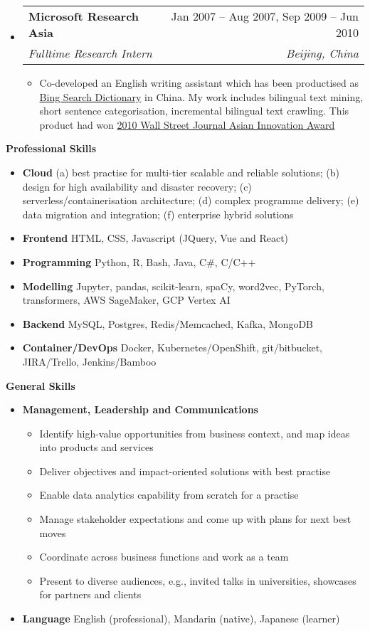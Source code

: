 \documentclass[letterpaper,12pt]{article}[leftmargin=*]
\makeatletter
\def \entryspacing {-0pt}
\renewcommand{\section}[2]{\vspace{5pt}
  \colorbox{secondary}{\color{white}\raggedbottom\normalsize\textbf{{#1}{\hspace{7pt}#2}}}
}
\newcommand{\resumeEntryStart}{\begin{itemize}[leftmargin=2.5mm]}
\newcommand{\resumeEntryEnd}{\end{itemize}\vspace{\entryspacing}}
\newcommand{\resumeItemListStart}{\begin{itemize}[leftmargin=4.5mm]}
\newcommand{\resumeItemListEnd}{\end{itemize}}
\newcommand{\resumeItem}[1]{
  \item\small{
    {#1 \vspace{-2pt}}
  }
}
\newcommand{\resumeEntryTSDL}[4]{
  \vspace{-1pt}\item[]
    \begin{tabularx}{0.97\textwidth}{X@{\hspace{60pt}}r}
      \textbf{\color{primary}#1} & {\firabook\color{accent}\small#2} \\
      \textit{\color{accent}\small#3} & \textit{\color{accent}\small#4} \\
    \end{tabularx}\vspace{-6pt}
}
\newcommand{\resumeEntryS}[2]{
  \item[]\small{
    \textbf{\color{primary}#1 }{ #2 \vspace{-6pt}}
  }
}
\makeatother
\begin{document}
  \resumeEntryStart
    \resumeEntryTSDL
      {Microsoft Research Asia}{Jan 2007 -- Aug 2007, Sep 2009 -- Jun 2010}
      {Fulltime Research Intern}{Beijing, China}
    \resumeItemListStart
      \resumeItem {Co-developed an English writing assistant which has been productised as \href{https://www.bing.com/dict?FORM=Z9LH3}{Bing Search Dictionary} in China. My work includes bilingual text mining, short sentence categorisation, incremental bilingual text crawling. This product had won \href{https://www.wsj.com/articles/SB10001424052748703545604575406771145298614}{2010 Wall Street Journal Asian Innovation Award}}
    \resumeItemListEnd
  \resumeEntryEnd

\section{\faGears}{Professional Skills}
 \resumeEntryStart
  \resumeEntryS{Cloud} {(a) best practise for multi-tier scalable and reliable solutions; (b) design for high availability and disaster recovery; (c) serverless/containerisation architecture; (d) complex programme delivery; (e) data migration and integration; (f) enterprise hybrid solutions}
  \resumeEntryS{Frontend} {HTML, CSS, Javascript (JQuery, Vue and React)}
  \resumeEntryS{Programming} {Python, R, Bash, Java, C\#, C/C++}
  \resumeEntryS{Modelling} {Jupyter, pandas, scikit-learn, spaCy, word2vec, PyTorch, transformers, AWS SageMaker, GCP Vertex AI}
  \resumeEntryS{Backend} {MySQL, Postgres, Redis/Memcached, Kafka, MongoDB}
  \resumeEntryS{Container/DevOps} {Docker, Kubernetes/OpenShift, git/bitbucket, JIRA/Trello, Jenkins/Bamboo}
 \resumeEntryEnd

\section{\faGears}{General Skills}

 \resumeEntryStart
  \resumeEntryS{Management, Leadership and Communications}{
   \resumeItemListStart
      \resumeItem {Identify high-value opportunities from business context, and map ideas into products and services}
      \resumeItem {Deliver objectives and impact-oriented solutions with best practise}
      \resumeItem {Enable data analytics capability from scratch for a practise}
      \resumeItem {Manage stakeholder expectations and come up with plans for next best moves}
      \resumeItem {Coordinate across business functions and work as a team}
      \resumeItem {Present to diverse audiences, e.g., invited talks in universities, showcases for partners and clients}
    \resumeItemListEnd}
  \resumeEntryS{Language} {English (professional), Mandarin (native), Japanese (learner)}
 \resumeEntryEnd
\end{document}
